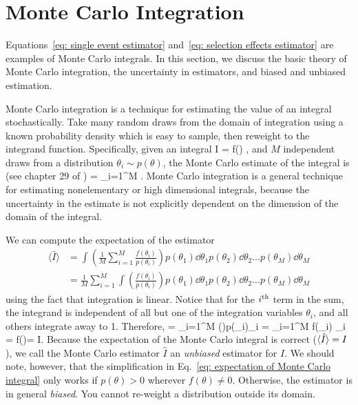 
\section{Monte Carlo Integration}
\label{sec: mc monte carlo integrals}

Equations~\ref{eq: single event estimator} and~\ref{eq: selection effects estimator} are examples of Monte Carlo integrals. In this section, we discuss the basic theory of Monte Carlo integration, the uncertainty in estimators, and biased and unbiased estimation.

Monte Carlo integration is a technique for estimating the value of an integral stochastically. Take many random draws from the domain of integration using a known probability density which is easy to sample, then reweight to the integrand function. Specifically, given an integral 
\beq
I = \int f(\theta) \dd\theta,
\eeq
and $M$ independent draws from a distribution $\theta_i \sim p(\theta)$, the Monte Carlo estimate of the integral is (see chapter 29 of \citet{MacKay2003})
\beq
{} = \sum_{i=1}^M .
\eeq
Monte Carlo integration is a general technique for estimating nonelementary or high dimensional integrals, because the uncertainty in the estimate is not explicitly dependent on the dimension of the domain of the integral. 

We can compute the expectation of the estimator
\begin{align}
\langle\hat{I}\rangle &= \int \left(\frac{1}{M}\sum_{i=1}^M \frac{f(\theta_i)}{p(\theta_i)}\right) p(\theta_1) \dd\theta_1 p(\theta_2) \dd\theta_2 ... p(\theta_M) \dd\theta_M  \nonumber \\ &= \frac{1}{M}\sum_{i=1}^M \int \left(\frac{f(\theta_i)}{p(\theta_i)}\right)p(\theta_1)\dd\theta_1 p(\theta_2) \dd\theta_2 ... p(\theta_M) \dd\theta_M
\end{align}
using the fact that integration is linear. Notice that for the $i^{\rm th}$ term in the sum, the integrand is independent of all but one of the integration variables $\theta_i$, and all others integrate away to 1. Therefore, 
\beq
\langle{}\rangle = \sum_{i=1}^M \int \left(\right)p(\theta_i)\dd\theta_i = \sum_{i=1}^M \int f(\theta_i) \dd\theta_i = \int f(\theta)\dd\theta = I.
\label{eq: expectation of Monte Carlo integral}
\eeq
Because the expectation of the Monte Carlo integral is correct ($\langle \hat{I}\rangle = I$), we call the Monte Carlo estimator $\hat{I}$ an \textit{unbiased} estimator for $I$. We should note, however, that the simplification in Eq.~\ref{eq: expectation of Monte Carlo integral} only works if $p(\theta) > 0$ wherever $f(\theta) \neq 0$. Otherwise, the estimator is in general \textit{biased}. You cannot re-weight a distribution outside its domain.

